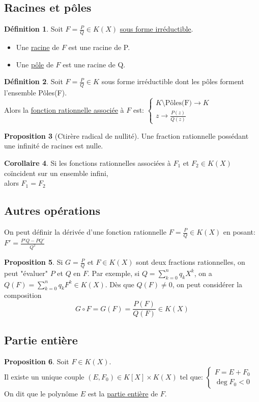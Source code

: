 \documentclass[10pt,a4paper]{article}
\theoremstyle{definition}
\newtheorem{proposition}{Proposition}[section]
\newtheorem{corollaire}[proposition]{Corollaire}
\newtheorem{definition}[proposition]{Définition}
\begin{document}
\subsection{Racines et pôles}
\begin{definition}
Soit $F = \frac{P}{Q} \in K(X)$ \uline{sous forme irréductible}.
\begin{itemize}
\item Une \uline{racine} de $F$ est une racine de P.
\item Une \uline{pôle} de $F$ est une racine de Q.
\end{itemize}
\end{definition}
\begin{definition}
Soit $F = \frac{P}{Q} \in K$ sous forme irréductible dont les pôles forment l'ensemble Pôles(F). \\
Alors la \uline{fonction rationnelle associée} à $F$ est: $\begin{cases}
K \setminus \text{Pôles(F)} \to K \\
z \to \frac{P(z)}{Q(z)}
\end{cases}$
\end{definition}
\begin{proposition}[Ctirère radical de nullité]
Une fraction rationnelle possédant une infinité de racines est nulle.
\end{proposition}
\begin{corollaire}
Si les fonctions rationnelles associées à $F_1$ et $F_2 \in K(X)$ coïncident sur un ensemble infini, \\
alors $F_1 = F_2$
\end{corollaire}

\subsection{Autres opérations}
On peut définir la dérivée d'une fonction rationnelle $F = \frac{P}{Q} \in K(X)$ en posant: $F' = \frac{P'Q - PQ'}{Q^2}$
\begin{proposition}
Si $G = \frac{P}{Q}$ et $F \in K(X)$ sont deux fractions rationnelles, on peut "évaluer" $P$ et $Q$ en $F$. Par exemple, si $Q = \sum\limits_{k = 0}^{n} q_k X^k$, on a $Q(F) = \sum\limits_{k = 0}^{n} q_k F^k \in K(X)$. Dès que $Q(F) \neq 0$, on peut considérer la composition
\[G \circ F = G(F) = \frac{P(F)}{Q(F)} \in K(X)\]
\end{proposition}

\subsection{Partie entière}
\begin{proposition}
Soit $F \in K(X)$. \\
Il existe un unique couple $(E, F_0) \in K[X] \times K(X)$ tel que: $\begin{cases}
F = E + F_0 \\
\deg{F_0} < 0
\end{cases}$ \\
On dit que le polynôme $E$ est la \uline{partie entière} de $F$.
\end{proposition}
\end{document}
